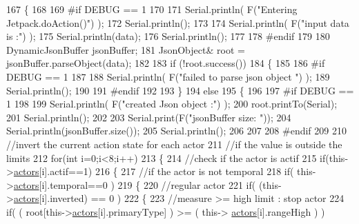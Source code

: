 \begin{DoxyCode}
167 \{
168 
169 \textcolor{preprocessor}{#if DEBUG == 1 }
170 
171     Serial.println( F(\textcolor{stringliteral}{"Entering Jetpack.doAction()"}) );
172     Serial.println();
173 
174     Serial.println( F(\textcolor{stringliteral}{"input data is :"}) );
175     Serial.println(data);
176     Serial.println();
177 
178 \textcolor{preprocessor}{#endif }
179 
180     DynamicJsonBuffer jsonBuffer;
181     JsonObject& root = jsonBuffer.parseObject(data);
182     
183     \textcolor{keywordflow}{if} (!root.success()) 
184     \{
185     
186 \textcolor{preprocessor}{    #if DEBUG == 1 }
187 
188         Serial.println( F(\textcolor{stringliteral}{"failed to parse json object "}) );
189         Serial.println();
190     
191 \textcolor{preprocessor}{    #endif }
192 
193     \}
194     \textcolor{keywordflow}{else}
195     \{
196     
197 \textcolor{preprocessor}{    #if DEBUG == 1 }
198 
199         Serial.println( F(\textcolor{stringliteral}{"created Json object :"}) );
200         root.printTo(Serial);
201         Serial.println();
202 
203         Serial.print(F(\textcolor{stringliteral}{"jsonBuffer size: "}));
204         Serial.println(jsonBuffer.size());
205         Serial.println();
206 
207     
208 \textcolor{preprocessor}{    #endif }
209 
210         \textcolor{comment}{//invert the current action state for each actor}
211         \textcolor{comment}{//if the value is outside the limits}
212         \textcolor{keywordflow}{for}(\textcolor{keywordtype}{int} i=0;i<8;i++)
213         \{
214             \textcolor{comment}{//check if the actor is actif }
215             \textcolor{keywordflow}{if}(this->\hyperlink{class_jetpack_a7e16d2f97837f9712a2e6de1c50d99db}{actors}[i].actif==1)
216             \{                       
217                 \textcolor{comment}{//if the actor is not temporal}
218                 \textcolor{keywordflow}{if}( this->\hyperlink{class_jetpack_a7e16d2f97837f9712a2e6de1c50d99db}{actors}[i].temporal==0 ) 
219                 \{   
220                     \textcolor{comment}{//regular actor}
221                     \textcolor{keywordflow}{if}( (this->\hyperlink{class_jetpack_a7e16d2f97837f9712a2e6de1c50d99db}{actors}[i].inverted) == 0 )
222                     \{
223                         \textcolor{comment}{//measure >= high limit : stop actor}
224                         \textcolor{keywordflow}{if}( ( root[this->\hyperlink{class_jetpack_a7e16d2f97837f9712a2e6de1c50d99db}{actors}[i].primaryType] ) >= ( this->
      \hyperlink{class_jetpack_a7e16d2f97837f9712a2e6de1c50d99db}{actors}[i].rangeHigh ) )   

\end{DoxyCode}
